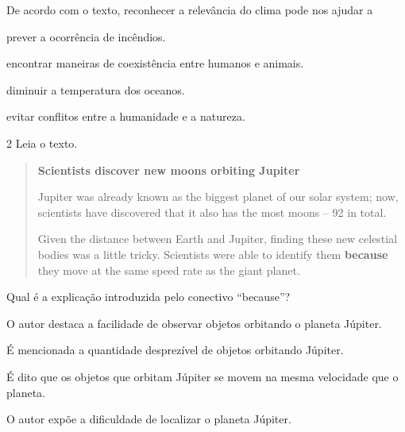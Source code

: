 De acordo com o texto, reconhecer a relevância do clima pode nos ajudar a

\begin{escolha}
\item prever a ocorrência de incêndios.

\item encontrar maneiras de coexistência entre humanos e animais.

\item diminuir a temperatura dos oceanos.

\item evitar conflitos entre a humanidade e a natureza.
\end{escolha}


\num{2} Leia o texto.

\begin{quote}
\textbf{Scientists discover new moons orbiting Jupiter}

Jupiter was already known as the biggest planet of our solar system; now, scientists have discovered that it also has the most moons – 92 in total.

Given the distance between Earth and Jupiter, finding these new celestial bodies was a little tricky. Scientists were able to identify them \textbf{because} they move at the same speed rate as the giant planet.

\end{quote}

Qual é a explicação introduzida pelo conectivo ``because''?

\begin{escolha}
\item O autor destaca a facilidade de observar objetos orbitando o planeta
Júpiter.

\item É mencionada a quantidade desprezível de objetos orbitando Júpiter.

\item É dito que os objetos que orbitam Júpiter se movem na mesma
velocidade que o planeta.

\item O autor expõe a dificuldade de localizar o planeta Júpiter.
\end{escolha}

